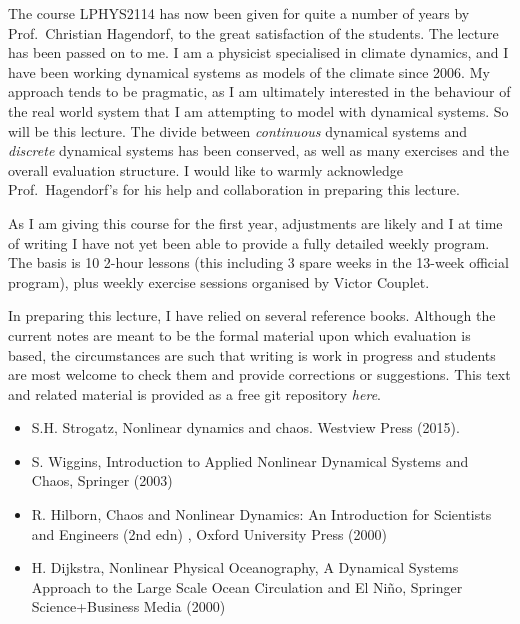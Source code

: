The course LPHYS2114 has now been given for quite a number of years by
Prof.~Christian Hagendorf, to the great satisfaction of the students.
The lecture has been passed on to me. I am a physicist specialised in
climate dynamics, and I have been working dynamical systems as models of
the climate since 2006. My approach tends to be pragmatic, as I am
ultimately interested in the behaviour of the real world system that I
am attempting to model with dynamical systems. So will be this lecture.
The divide between \emph{continuous} dynamical systems and
\emph{discrete} dynamical systems has been conserved, as well as many
exercises and the overall evaluation structure. I would like to warmly
acknowledge Prof.~Hagendorf's for his help and collaboration in
preparing this lecture.

As I am giving this course for the first year, adjustments are likely
and I at time of writing I have not yet been able to provide a fully
detailed weekly program. The basis is 10 2-hour lessons (this including
3 spare weeks in the 13-week official program), plus weekly exercise
sessions organised by Victor Couplet.

In preparing this lecture, I have relied on several reference books.
Although the current notes are meant to be the formal material upon
which evaluation is based, the circumstances are such that writing is
work in progress and students are most welcome to check them and provide
corrections or suggestions. This text and related material is provided
as a free git repository \emph{here}.

\begin{itemize}
\tightlist
\item
  S.H. Strogatz, Nonlinear dynamics and chaos. Westview Press (2015).
\item
  S. Wiggins, Introduction to Applied Nonlinear Dynamical Systems and
  Chaos, Springer (2003)
\item
  R. Hilborn, Chaos and Nonlinear Dynamics: An Introduction for
  Scientists and Engineers (2nd edn) , Oxford University Press (2000)
\item
  H. Dijkstra, Nonlinear Physical Oceanography, A Dynamical Systems
  Approach to the Large Scale Ocean Circulation and El Niño, Springer
  Science+Business Media (2000)
\end{itemize}
